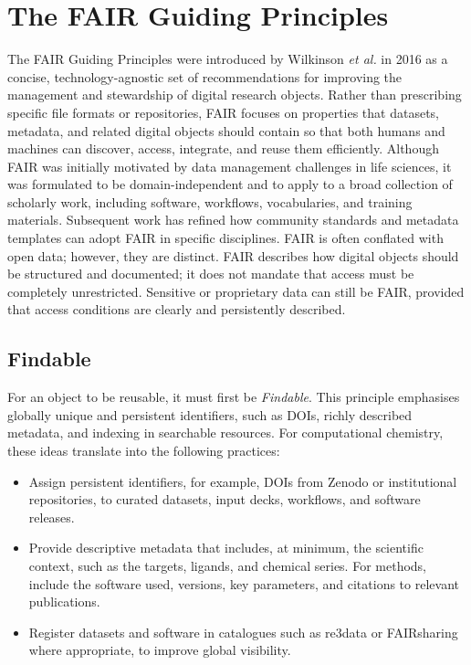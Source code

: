\documentclass[12pt]{article}
\begin{document}
\section{The FAIR Guiding Principles}

The FAIR Guiding Principles were introduced by Wilkinson \emph{et al.} in 2016 as a concise, technology-agnostic set of recommendations for improving the management and stewardship of digital research objects\cite{CH12_wilkinson2016FAIR}. Rather than prescribing specific file formats or repositories, FAIR focuses on properties that datasets, metadata, and related digital objects should contain so that both humans and machines can discover, access, integrate, and reuse them efficiently\cite{CH12_wilkinson2016FAIR,CH12_goFairPrinciples}. Although FAIR was initially motivated by data management challenges in life sciences, it was formulated to be domain-independent and to apply to a broad collection of scholarly work, including software, workflows, vocabularies, and training materials\cite{CH12_wilkinson2016FAIR,CH12_goFairPrinciples,CH12_turingWayFAIR}. Subsequent work has refined how community standards and metadata templates can adopt FAIR in specific disciplines\cite{CH12_communityTemplates2022,CH12_healthFAIR2022}. FAIR is often conflated with open data; however, they are distinct. FAIR describes how digital objects should be structured and documented; it does not mandate that access must be completely unrestricted. Sensitive or proprietary data can still be FAIR, provided that access conditions are clearly and persistently described\cite{CH12_goFairPrinciples,CH12_nnlmFAIR}.

\subsection{Findable}

For an object to be reusable, it must first be \emph{Findable}. This principle emphasises globally unique and persistent identifiers, such as DOIs, richly described metadata, and indexing in searchable resources\cite{CH12_wilkinson2016FAIR,CH12_goFairPrinciples,CH12_turingWayFAIR}. For computational chemistry, these ideas translate into the following practices:

\begin{itemize}
  \item Assign persistent identifiers, for example, DOIs from Zenodo\cite{CH12_sicilia2017community} or institutional repositories, to curated datasets, input decks, workflows, and software releases.
  \item Provide descriptive metadata that includes, at minimum, the scientific context, such as the targets, ligands, and chemical series. For methods, include the software used, versions, key parameters, and citations to relevant publications.
  \item Register datasets and software in catalogues such as re3data or FAIRsharing where appropriate, to improve global visibility.
\end{itemize}
\end{document}

